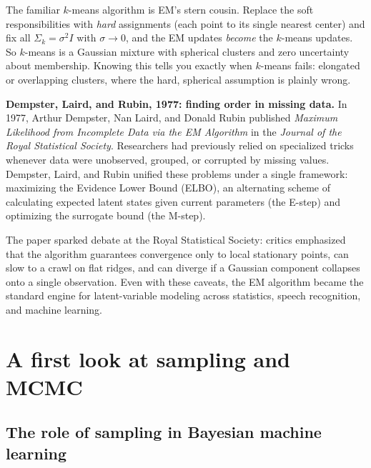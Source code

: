 \begin{connectionbox}
The familiar $k$-means algorithm is EM's stern cousin. Replace the soft
responsibilities with \emph{hard} assignments (each point to its single nearest
center) and fix all $\Sigma_k = \sigma^2 I$ with $\sigma\to 0$, and the EM updates
\emph{become} the $k$-means updates. So $k$-means is a Gaussian mixture with
spherical clusters and zero uncertainty about membership. Knowing this tells you
exactly when $k$-means fails: elongated or overlapping clusters, where the hard,
spherical assumption is plainly wrong.
\end{connectionbox}

\begin{historybox}
\textbf{Dempster, Laird, and Rubin, 1977: finding order in missing data.}
In 1977, Arthur Dempster, Nan Laird, and Donald Rubin published \emph{Maximum Likelihood from Incomplete Data via the EM Algorithm} in the \emph{Journal of the Royal Statistical Society}. Researchers had previously relied on specialized tricks whenever data were unobserved, grouped, or corrupted by missing values. Dempster, Laird, and Rubin unified these problems under a single framework: maximizing the Evidence Lower Bound (ELBO), an alternating scheme of calculating expected latent states given current parameters (the E-step) and optimizing the surrogate bound (the M-step).

The paper sparked debate at the Royal Statistical Society: critics emphasized that the algorithm guarantees convergence only to local stationary points, can slow to a crawl on flat ridges, and can diverge if a Gaussian component collapses onto a single observation. Even with these caveats, the EM algorithm became the standard engine for latent-variable modeling across statistics, speech recognition, and machine learning.
\end{historybox}

\section{A first look at sampling and MCMC}
\label{ch34:mcmc}

\subsection{The role of sampling in Bayesian machine learning}

